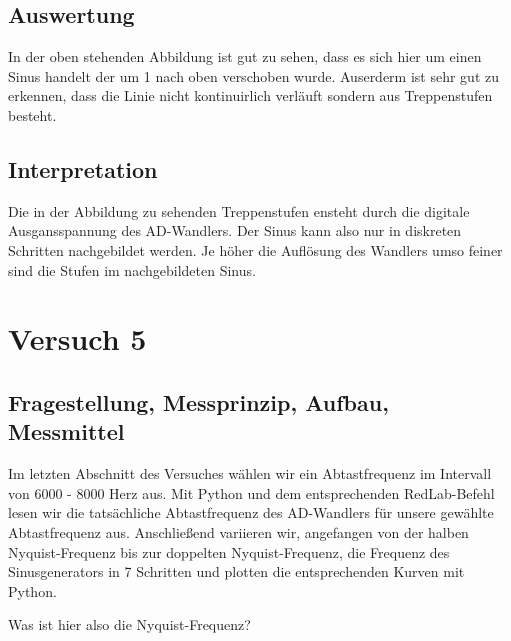 \documentclass[12pt, oneside, a4paper, \docLanguage]{report}
\begin{document}
\section{Auswertung}
\label{chap:VERSUCH_4_AUSWERTUNG}
\begin{normalsize}
In der oben stehenden Abbildung ist gut zu sehen, dass es sich hier um einen
Sinus handelt der um 1 nach oben verschoben wurde. Auserderm ist sehr gut zu erkennen,
dass die Linie nicht kontinuirlich verläuft sondern aus Treppenstufen besteht.
\end{normalsize}

\section{Interpretation}
\label{chap:VERSUCH_4_INTERPRETATION}
\begin{normalsize}
Die in der Abbildung zu sehenden Treppenstufen ensteht durch die digitale Ausgansspannung des AD-Wandlers.
Der Sinus kann also nur in diskreten Schritten nachgebildet werden. Je höher die Auflösung des Wandlers umso feiner sind
die Stufen im nachgebildeten Sinus. 
\end{normalsize}
%
%
\chapter{Versuch 5}
\label{chap:VERSUCH_5}

\section{Fragestellung, Messprinzip, Aufbau, Messmittel}
\label{chap:VERSUCH_5_FRAGESTELLUNG}
\begin{normalsize}
	Im letzten Abschnitt des Versuches wählen wir ein Abtastfrequenz im Intervall von 6000 - 8000 Herz aus.
	Mit Python und dem entsprechenden RedLab-Befehl lesen wir die tatsächliche Abtastfrequenz des AD-Wandlers für unsere gewählte Abtastfrequenz aus.
	\newline
	Anschließend variieren wir, angefangen von der halben Nyquist-Frequenz bis zur doppelten Nyquist-Frequenz,
	die Frequenz des Sinusgenerators in 7 Schritten und plotten die entsprechenden Kurven mit Python.
\end{normalsize}
\newline
\newline
Was ist hier also die Nyquist-Frequenz?
\end{document}
